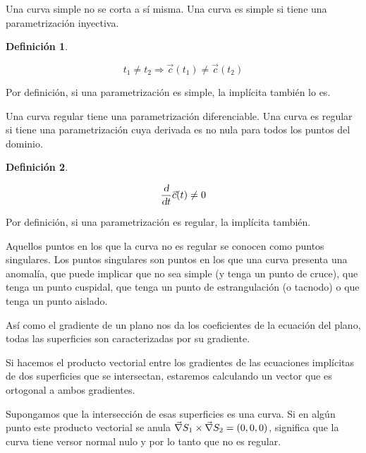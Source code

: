 \documentclass[a5paper,12pt,twoside]{book}
\newtheorem{defn}{{Definición}}[chapter]
\begin{document}
Una curva simple no se corta a sí misma.
Una curva es simple si tiene una parametrización inyectiva.

\begin{mdframed}[style=DefinitionFrame]
    \begin{defn}
    \end{defn}
    \begin{equation*}
        t_1 \neq t_2 \Rightarrow \Vec{c}(t_1) \neq \Vec{c}(t_2)
    \end{equation*}
\end{mdframed}

Por definición, si una parametrización es simple, la implícita también lo es.

Una curva regular tiene una parametrización diferenciable.
Una curva es regular si tiene una parametrización cuya derivada es no nula para todos los puntos del dominio.

\begin{mdframed}[style=DefinitionFrame]
    \begin{defn}
    \end{defn}
    \begin{equation*}
        \frac{\textsl{d}}{\textsl{d} t} \Vec{c}(t) \neq 0
    \end{equation*}
\end{mdframed}

Por definición, si una parametrización es regular, la implícita también.

Aquellos puntos en los que la curva no es regular se conocen como puntos singulares.
Los puntos singulares son puntos en los que una curva presenta una anomalía, que puede implicar que no sea simple (y tenga un punto de cruce), que tenga un punto cuspidal, que tenga un punto de estrangulación (o tacnodo) o que tenga un punto aislado.

Así como el gradiente de un plano nos da los coeficientes de la ecuación del plano, todas las superficies son caracterizadas por su gradiente.

Si hacemos el producto vectorial entre los gradientes de las ecuaciones implícitas de dos superficies que se intersectan, estaremos calculando un vector que es ortogonal a ambos gradientes.

Supongamos que la intersección de esas superficies es una curva.
Si en algún punto este producto vectorial se anula $\Vec{\nabla} S_1 \times \Vec{\nabla} S_2 = (0,0,0)$, significa que la curva tiene versor normal nulo y por lo tanto que no es regular.
\end{document}
